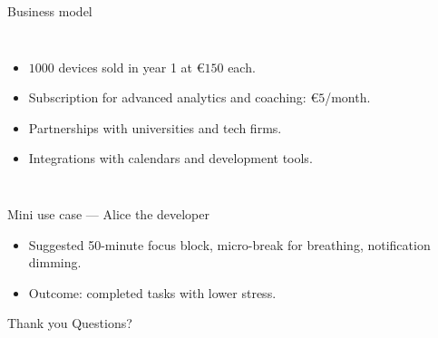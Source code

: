 \documentclass[10pt]{beamer}
\begin{document}
\begin{frame}{Business model}
    \begin{columns}
        \begin{itemize}
            \item \(1000\) devices sold in year 1 at \(€150\) each.
            \item Subscription for advanced analytics and coaching: \(€5\)/month.
            \item Partnerships with universities and tech firms.
            \item Integrations with calendars and development tools.
        \end{itemize}
    \end{columns}
\end{frame}

\begin{frame}{Mini use case --- Alice the developer}
    \vspace{0.2cm}
    \begin{itemize}
        \item Suggested 50-minute focus block, micro-break for breathing, notification dimming.
        \item Outcome: completed tasks with lower stress.
    \end{itemize}
\end{frame}

\begin{frame}{Thank you}
        \vspace{0.4cm}
        \centering
        \Large{Questions?}
\end{frame}
\end{document}
